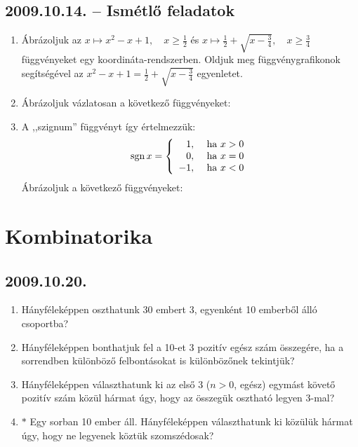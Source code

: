 \subsection*{2009.10.14. -- Ismétlő feladatok}
\begin{enumerate}
\item Ábrázoljuk az $x\mapsto x^2-x+1,\quad x\ge \frac{1}{2}$ és 
$x\mapsto \frac{1}{2}+\sqrt{x-\frac{3}{4}},\quad x\ge \frac{3}{4}$ 
függvényeket egy koordináta-rendszerben. Oldjuk meg függvénygrafikonok 
segítségével az $x^2-x+1=\frac{1}{2}+\sqrt{x-\frac{3}{4}}$ egyenletet.
\item Ábrázoljuk vázlatosan a következő függvényeket:
\item A ,,szignum'' függvényt így értelmezzük:
$$\mathop{\mathrm{sgn}}\nolimits x = \left\{
\begin{array}{rl}
1,~&\text{ha~} x>0\cr
0,~&\text{ha~} x=0\cr
-1,~&\text{ha~} x<0
\end{array}
\right. $$
Ábrázoljuk a következő függvényeket:
\end{enumerate}



\section{Kombinatorika}

\subsection*{2009.10.20.}
\begin{enumerate}
\item Hányféleképpen oszthatunk 30 embert 3, egyenként 10 emberből álló csoportba?
\item Hányféleképpen bonthatjuk fel a 10-et 3 pozitív egész szám összegére, ha a sorrendben különböző felbontásokat is különbözőnek tekintjük?
\item Hányféleképpen választhatunk ki az első 3 ($n>0$, egész) egymást követő pozitív szám közül hármat úgy, hogy az összegük osztható legyen 3-mal?
\item $*$ Egy sorban 10 ember áll. Hányféleképpen választhatunk ki közülük hármat úgy, hogy ne legyenek köztük szomszédosak?
\end{enumerate}

